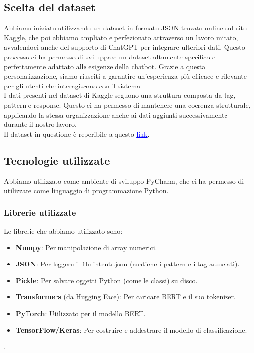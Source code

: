 \documentclass[12pt, letterpaper]{article}
\begin{document}
\subsection{Scelta del dataset}
Abbiamo iniziato utilizzando un dataset in formato JSON trovato online sul sito Kaggle, che poi abbiamo ampliato e perfezionato attraverso un lavoro mirato, avvalendoci anche del supporto di ChatGPT per integrare ulteriori dati. Questo processo ci ha permesso di sviluppare un dataset altamente specifico e perfettamente adattato alle esigenze della chatbot. Grazie a questa personalizzazione, siamo riusciti a garantire un’esperienza più efficace e rilevante per gli utenti che interagiscono con il sistema.\\
I dati presenti nel dataset di Kaggle seguono una struttura composta da tag, pattern e response. Questo ci ha permesso di mantenere una coerenza strutturale, applicando la stessa organizzazione anche ai dati aggiunti successivamente durante il nostro lavoro.\\
Il dataset in questione è reperibile a questo \href{https://www.kaggle.com/code/jocelyndumlao/chatbot-for-mental-health-conversations}{\textcolor{blue}{\underline{link}}}.

\subsection{Tecnologie utilizzate}
Abbiamo utilizzato come ambiente di sviluppo PyCharm, che ci ha permesso di utilizzare come linguaggio di programmazione Python. 

\subsubsection{Librerie utilizzate}
Le librerie che abbiamo utilizzato sono:
\begin{itemize}
\item \textbf{Numpy}: Per manipolazione di array numerici.
\item \textbf{JSON}: Per leggere il file intents.json (contiene i pattern e i tag associati).
\item \textbf{Pickle}: Per salvare oggetti Python (come le classi) su disco.
\item \textbf{Transformers} (da Hugging Face): Per caricare BERT e il suo tokenizer.
\item \textbf{PyTorch}: Utilizzato per il modello BERT.
\item \textbf{TensorFlow/Keras}: Per costruire e addestrare il modello di classificazione.
\end{itemize}.
\end{document}
